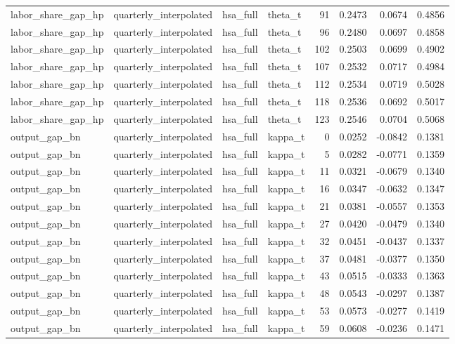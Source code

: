 \begin{tabular}{llllrrrr}
labor\_share\_gap\_hp & quarterly\_interpolated & hsa\_full & theta\_t & 91 & 0.2473 & 0.0674 & 0.4856 \\
labor\_share\_gap\_hp & quarterly\_interpolated & hsa\_full & theta\_t & 96 & 0.2480 & 0.0697 & 0.4858 \\
labor\_share\_gap\_hp & quarterly\_interpolated & hsa\_full & theta\_t & 102 & 0.2503 & 0.0699 & 0.4902 \\
labor\_share\_gap\_hp & quarterly\_interpolated & hsa\_full & theta\_t & 107 & 0.2532 & 0.0717 & 0.4984 \\
labor\_share\_gap\_hp & quarterly\_interpolated & hsa\_full & theta\_t & 112 & 0.2534 & 0.0719 & 0.5028 \\
labor\_share\_gap\_hp & quarterly\_interpolated & hsa\_full & theta\_t & 118 & 0.2536 & 0.0692 & 0.5017 \\
labor\_share\_gap\_hp & quarterly\_interpolated & hsa\_full & theta\_t & 123 & 0.2546 & 0.0704 & 0.5068 \\
output\_gap\_bn & quarterly\_interpolated & hsa\_full & kappa\_t & 0 & 0.0252 & -0.0842 & 0.1381 \\
output\_gap\_bn & quarterly\_interpolated & hsa\_full & kappa\_t & 5 & 0.0282 & -0.0771 & 0.1359 \\
output\_gap\_bn & quarterly\_interpolated & hsa\_full & kappa\_t & 11 & 0.0321 & -0.0679 & 0.1340 \\
output\_gap\_bn & quarterly\_interpolated & hsa\_full & kappa\_t & 16 & 0.0347 & -0.0632 & 0.1347 \\
output\_gap\_bn & quarterly\_interpolated & hsa\_full & kappa\_t & 21 & 0.0381 & -0.0557 & 0.1353 \\
output\_gap\_bn & quarterly\_interpolated & hsa\_full & kappa\_t & 27 & 0.0420 & -0.0479 & 0.1340 \\
output\_gap\_bn & quarterly\_interpolated & hsa\_full & kappa\_t & 32 & 0.0451 & -0.0437 & 0.1337 \\
output\_gap\_bn & quarterly\_interpolated & hsa\_full & kappa\_t & 37 & 0.0481 & -0.0377 & 0.1350 \\
output\_gap\_bn & quarterly\_interpolated & hsa\_full & kappa\_t & 43 & 0.0515 & -0.0333 & 0.1363 \\
output\_gap\_bn & quarterly\_interpolated & hsa\_full & kappa\_t & 48 & 0.0543 & -0.0297 & 0.1387 \\
output\_gap\_bn & quarterly\_interpolated & hsa\_full & kappa\_t & 53 & 0.0573 & -0.0277 & 0.1419 \\
output\_gap\_bn & quarterly\_interpolated & hsa\_full & kappa\_t & 59 & 0.0608 & -0.0236 & 0.1471 \\

\end{tabular}

